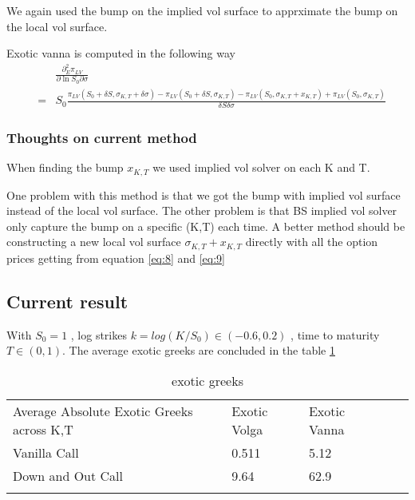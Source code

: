 \documentclass[12pt]{article}
\numberwithin{equation}{section}
\begin{document}
We again used the bump on the implied vol surface to apprximate the bump on the local vol surface.

Exotic vanna is computed in the following way
\begin{eqnarray} 
    &&\frac{\partial_E^2 \pi_{LV}}{\partial \ln S_0 \partial \sigma}\\
    &=&S_0\frac{\pi_{LV}(S_0+\delta S ,\sigma_{K,T}+\delta \sigma)-\pi_{LV}(S_0+\delta S ,\sigma_{K,T})-\pi_{LV}(S_0,\sigma_{K,T}+x_{K,T})+\pi_{LV}(S_0,\sigma_{K,T})}
    {\delta S \delta \sigma}
\end{eqnarray} 

\subsubsection{Thoughts on current method}
When finding the bump $x_{K,T}$ we used implied vol solver on each K and T.

One problem with this method is that we got the bump with implied vol surface instead of
the local vol surface. The other problem is that BS implied vol solver only capture the bump
on a specific (K,T) each time.
A better method should be constructing a new local vol surface $\sigma_{K,T}+x_{K,T}$ directly with all the option prices
getting from equation \ref{eq:8} and \ref{eq:9}

\subsection{Current result}
With $S_0=1$ , log strikes $k=log(K/S_0) \in (-0.6,0.2)$ , time to maturity $T \in (0,1)$. The average exotic greeks are concluded in the table \ref{table:exotic greeks}
\begin{table}[]
    \begin{tabular}{lllll}
    \cline{1-3}
    \multicolumn{1}{|l|}{Average Absolute Exotic Greeks across K,T} & \multicolumn{1}{l|}{Exotic Volga} & \multicolumn{1}{l|}{Exotic Vanna} &  &  \\ \cline{1-3}
    \multicolumn{1}{|l|}{Vanilla Call}                     & \multicolumn{1}{l|}{0.511}  & \multicolumn{1}{l|}{5.12}    &  &  \\ \cline{1-3}
    \multicolumn{1}{|l|}{Down and Out Call}                & \multicolumn{1}{l|}{9.64}       & \multicolumn{1}{l|}{62.9}       &  &  \\ \cline{1-3}
                                                           &                                   &                                   &  & 
    \end{tabular}
    \caption{exotic greeks}
    \label{table:exotic greeks}
\end{table}
\end{document}
